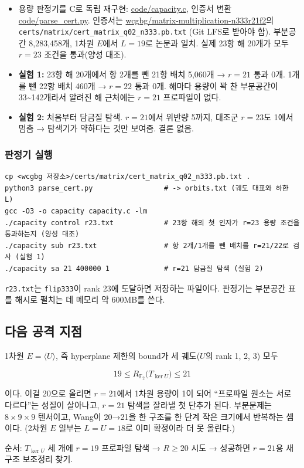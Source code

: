 \begin{itemize}
\tightlist
\item
  용량 판정기를 C로 독립 재구현: \url{code/capacity.c}, 인증서 변환
  \url{code/parse_cert.py}. 인증서는
  \href{https://github.com/wcgbg/matrix-multiplication-n333r21f2}{wcgbg/matrix-multiplication-n333r21f2}의
  \texttt{certs/matrix/cert\_matrix\_q02\_n333.pb.txt} (Git LFS로 받아야
  함). 부분공간 8,283,458개, 1차원 \(E\)에서 \(L=19\)로 논문과 일치.
  실제 23항 해 20개가 모두 \(r=23\) 조건을 통과(양성 대조).
\item
  \textbf{실험 1:} 23항 해 20개에서 항 2개를 뺀 21항 배치 5,060개 →
  \(r=21\) 통과 0개. 1개를 뺀 22항 배치 460개 → \(r=22\) 통과 0개.
  해마다 용량이 꽉 찬 부분공간이 33\textasciitilde142개라서 알려진 해
  근처에는 \(r=21\) 프로파일이 없다.
\item
  \textbf{실험 2:} 처음부터 담금질 탐색. \(r=21\)에서 위반량 5까지,
  대조군 \(r=23\)도 1에서 멈춤 → 탐색기가 약하다는 것만 보여줌. 결론
  없음.
\end{itemize}

\subsubsection{판정기 실행}

\begin{verbatim}
cp <wcgbg 저장소>/certs/matrix/cert_matrix_q02_n333.pb.txt .
python3 parse_cert.py                 # -> orbits.txt (궤도 대표와 하한 L)
gcc -O3 -o capacity capacity.c -lm
./capacity control r23.txt            # 23항 해의 첫 인자가 r=23 용량 조건을 통과하는지 (양성 대조)
./capacity sub r23.txt                # 항 2개/1개를 뺀 배치를 r=21/22로 검사 (실험 1)
./capacity sa 21 400000 1             # r=21 담금질 탐색 (실험 2)
\end{verbatim}

\texttt{r23.txt}는 \texttt{flip333}이 rank 23에 도달하면 저장하는
파일이다. 판정기는 부분공간 표를 해시로 펼치는 데 메모리 약 600MB를
쓴다.

\subsection{다음 공격 지점}

1차원 \(E=\langle U\rangle\), 즉 hyperplane 제한의 bound가 세
궤도(\(U\)의 rank 1, 2, 3) 모두

\[
19\le R_{\mathbb F_2}\big(T_{\ker U}\big)\le21
\]

이다. 이걸 20으로 올리면 \(r=21\)에서 1차원 용량이 1이 되어 ``프로파일
원소는 서로 다르다''는 성질이 살아나고, \(r=21\) 탐색을 잘라낼 첫 단추가
된다. 부분문제는 \(8\times9\times9\) 텐서이고, Wang이 20→21을 한 구조를
한 단계 작은 크기에서 반복하는 셈이다. (2차원 \(E\) 일부는 \(L=U=18\)로
이미 확정이라 더 못 올린다.)

순서: \(T_{\ker U}\) 세 개에 \(r=19\) 프로파일 탐색 → \(R\ge20\) 시도 →
성공하면 \(r=21\)용 새 구조 보조정리 찾기.
